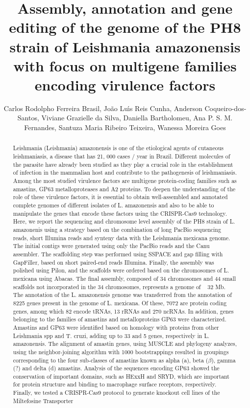 \documentclass[twoside]{article}
\title{\vspace{-15mm}\fontsize{24pt}{10pt}\selectfont\textbf{ Assembly,  annotation and gene editing of the genome of the PH8 strain of Leishmania amazonensis with focus on multigene families encoding  virulence factors }} %
\author{ Carlos Rodolpho Ferreira Brasil,  Jo\~ao Lu\'{\i}s Reis Cunha,  Anderson Coqueiro-dos-Santos,  Viviane Grazielle da Silva,  Daniella Bartholomeu,  Ana P. S. M. Fernandes,  Santuza Maria Ribeiro Teixeira,  Wanessa Moreira Goes }
\affil{ UNIVERSIDADE FEDERAL DE MINAS GERAIS }
\date{}
\begin{document}
  
  
  \maketitle %
  
  
  \thispagestyle{fancy} %
  
  
  \begin{abstract}
  Leishmania (Leishmania) amazonensis is one of the etiological agents of cutaneous leishmaniasis,  a disease that has 21, 000 cases / year in Brazil. Different molecules of the parasite have already been studied as they play a crucial role in the establishment of infection in the mammalian host and contribute to the pathogenesis of leishmaniasis. Among the most studied virulence factors are multigene protein-coding families such as amastins,  GP63 metalloproteases and A2 proteins. To deepen the understanding of the role of these virulence factors,  it is essential to obtain well-assembled and annotated complete genomes of different isolates of L. amazonensis and also to be able to manipulate the genes that encode these factors using the CRISPR-Cas9 technology. Here,  we report the sequencing and chromosome level assembly of the PH8 strain of L. amazonenis using a strategy based on the combination of long PacBio sequencing reads,  short Illumina reads and synteny data with the Leishmania mexicana genome. The initial contigs were generated using only the PacBio reads and the Canu assembler. The scaffolding step was performed using SSPACE and gap filling with GapFiller,  based on short paired-end reads Illumina. Finally,  the assembly was polished using Pilon,  and the scaffolds were ordered based on the chromosomes of L. mexicana using Abacas. The final assembly,  composed of 34 chromosomes and 44 small scaffolds not incorporated in the 34 chromosomes,  represents a genome of ~ 32 Mb. The annotation of the L. amazonensis genome was transferred from the annotation of 8225 genes present in the genome of L. mexicana. Of these,  7072 are protein coding genes,  among which 82 encode tRNAs,  13 rRNAs and 270 ncRNAs. In addition,  genes belonging to the families of amastins and metalloproteins GP63 were characterized. Amastins and GP63 were identified based on homology with proteins from other Leishmania spp and T. cruzi,  adding up to 33 and 5 genes,  respectively in L. amazonensis. The alignment of amastin genes,  using MUSCLE and phylogeny analyzes,  using the neighbor-joining algorithm with 1000 bootstrappings resulted in groupings corresponding to the four sub-classes of amastins known as alpha (a),  beta ($\beta$),  gamma (?) and delta (d) amastins. Analysis of the sequences encoding GP63 showed the conservation of important domains,  such as HExxH and SRYD,  which are important for protein structure and binding to macrophage surface receptors,  respectively. Finally,  we tested a CRISPR-Cas9 protocol to generate knockout cell lines of the Miltefosine Transporter 
\end{abstract}
\end{document}
